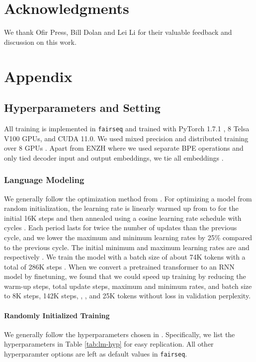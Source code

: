 \documentclass[11pt,a4paper]{article}
\begin{document}
\section*{Acknowledgments}
We thank Ofir Press, Bill Dolan and Lei Li for their valuable feedback and discussion on this work.




\appendix
\newpage
\newpage

\section{Appendix}
\subsection{Hyperparameters and Setting}
\label{sec:hyper}
All training is implemented in \texttt{fairseq} \cite{ott-etal-2019-fairseq} and trained with PyTorch 1.7.1 \cite{pytorch}, 8 Telsa V100 GPUs, and CUDA 11.0.
We used mixed precision and distributed training over 8 GPUs \cite{micikevicius2018mixed, Ott2018ScalingNM}.
Apart from ENZH where we used separate BPE operations and only tied decoder input and output embeddings, we tie all embeddings \cite{Press2017UsingTO, Inan2017TyingWV}.

\subsubsection{Language Modeling}
We generally follow the optimization method from \citet{Baevski2019AdaptiveIR}.
For optimizing a model from random initialization, the learning rate is linearly warmed up from  to  for the initial 16K steps and then annealed using a cosine learning rate schedule with cycles \cite{cosine}.
Each period lasts for twice the number of updates than the previous cycle, and we lower the maximum and minimum learning rates by 25\% compared to the previous cycle.
The initial minimum and maximum learning rates are  and  respectively \cite{Baevski2019AdaptiveIR}.
We train the model with a batch size of about 74K tokens with a total of 286K steps \cite{Baevski2019AdaptiveIR}.
When we convert a pretrained transformer to an RNN model by finetuning, we found that we could speed up training by reducing the warm-up steps, total update steps, maximum and minimum rates, and batch size to 8K steps, 142K steps, , , and 25K tokens without loss in validation perplexity.
\paragraph{Randomly Initialized Training}
We generally follow the hyperparameters chosen in \citet{Baevski2019AdaptiveIR,layerdrop}.
Specifically, we list the hyperparameters in Table \ref{tab:lm-hyp} for easy replication. All other hyperparamter options are left as default values in \texttt{fairseq}.
\end{document}
